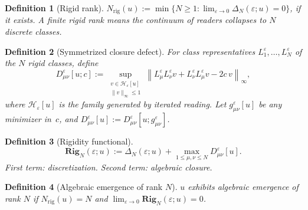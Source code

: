 \documentclass[11pt,a4paper]{article}
\newtheorem{definition}{Definition}
\newcommand{\HH}{\mathcal{H}}
\begin{document}
\begin{definition}[Rigid rank]
\label{def:rigidrank}
$N_{\mathrm{rig}}(u) := \min\{N \ge 1 :
\lim_{\varepsilon\to0}\Delta_N(\varepsilon;u) = 0\}$,
if it exists. A finite rigid rank means the continuum of readers
collapses to $N$ discrete classes.
\end{definition}

\begin{definition}[Symmetrized closure defect]
\label{def:defect}
For class representatives $L_1^\varepsilon,\ldots,L_N^\varepsilon$
of the $N$ rigid classes, define
\[
D_{\mu\nu}^\varepsilon[u;c] := \sup_{\substack{v \in \HH_\varepsilon[u]\\
\|v\|_\infty \le 1}}
\left\| L_\mu^\varepsilon L_\nu^\varepsilon v
+ L_\nu^\varepsilon L_\mu^\varepsilon v - 2c\,v \right\|_\infty,
\]
where $\HH_\varepsilon[u]$ is the family generated by iterated reading.
Let $g_{\mu\nu}^\varepsilon[u]$ be any minimizer in~$c$, and
$D_{\mu\nu}^\varepsilon[u] := D_{\mu\nu}^\varepsilon[u; g_{\mu\nu}^\varepsilon]$.
\end{definition}

\begin{definition}[Rigidity functional]
\label{def:rigidity}
\[
\mathbf{Rig}_N(\varepsilon; u) :=
\Delta_N(\varepsilon; u) + \max_{1\le\mu,\nu\le N}
D_{\mu\nu}^\varepsilon[u].
\]
First term: discretization. Second term: algebraic closure.
\end{definition}

\begin{definition}[Algebraic emergence of rank $N$]
\label{def:emergence}
$u$ exhibits \emph{algebraic emergence of rank $N$} if
$N_{\mathrm{rig}}(u) = N$ and
$\lim_{\varepsilon\to0}\mathbf{Rig}_N(\varepsilon;u) = 0$.
\end{definition}
\end{document}
